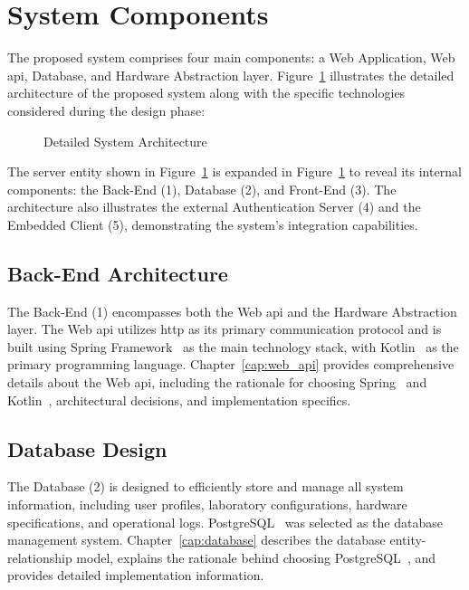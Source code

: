 \section{System Components}\label{sec:system_components}
The proposed system comprises four main components: a Web Application, Web \acs{api}, Database, and Hardware Abstraction layer. Figure~\ref{fig:detailed_architecture} illustrates the detailed architecture of the proposed system along with the specific technologies considered during the design phase:

\begin{figure}[H]
    \centering
    
\caption{Detailed System Architecture}
\label{fig:detailed_architecture}
\end{figure}

The server entity shown in Figure~\ref{fig:detailed_architecture} is expanded in Figure~\ref{fig:detailed_architecture} to reveal its internal components: the Back-End (1), Database (2), and Front-End (3). The architecture also illustrates the external Authentication Server (4) and the Embedded Client (5), demonstrating the system's integration capabilities.

\subsection*{Back-End Architecture}
The Back-End (1) encompasses both the Web \acs{api} and the Hardware Abstraction layer. The Web \acs{api} utilizes \acf{http} as its primary communication protocol and is built using Spring Framework~\cite{spring-framework} as the main technology stack, with Kotlin~\cite{kotlin} as the primary programming language. Chapter~\ref{cap:web_api} provides comprehensive details about the Web \acs{api}, including the rationale for choosing Spring~\cite{spring} and Kotlin~\cite{kotlin}, architectural decisions, and implementation specifics.

\subsection*{Database Design}
The Database (2) is designed to efficiently store and manage all system information, including user profiles, laboratory configurations, hardware specifications, and operational logs. PostgreSQL~\cite{postgresql} was selected as the database management system. Chapter~\ref{cap:database} describes the database entity-relationship model, explains the rationale behind choosing PostgreSQL~\cite{postgresql}, and provides detailed implementation information.

